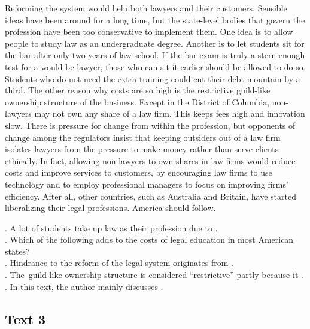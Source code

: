   Reforming the system would help both lawyers and their customers. Sensible ideas have been around for a long time, but the state-level bodies that govern the profession have been too conservative to implement them. One idea is to allow people to study law as an undergraduate degree. Another is to let students sit for the bar after only two years of law school. If the bar exam is truly a stern enough test for a would-be lawyer, those who can sit it earlier should be allowed to do so. Students who do not need the extra training could cut their debt mountain by a third.
The other reason why costs are so high is the restrictive guild-like ownership structure of the business. Except in the District of Columbia, non-lawyers may not own any share of a law firm. This keeps fees high and innovation slow. There is pressure for change from within the profession, but opponents of change among the regulators insist that keeping outsiders out of a law firm isolates lawyers from the pressure to make money rather than serve clients ethically.
In fact, allowing non-lawyers to own shares in law firms would reduce costs and improve services to customers, by encouraging law firms to use technology and to employ professional managers to focus on improving firms’ efficiency. After all, other countries, such as Australia and Britain, have started liberalizing their legal professions. America should follow.
\begin{questions} . A lot of students take up law as their profession due to \ltk{}.
\\ . Which of the following adds to the costs of legal education in most American states?
\\ . Hindrance to the reform of the legal system originates from \ltk{}.
\\ . The guild-like ownership structure is considered “restrictive” partly because it \ltk{}.
\\ . In this text, the author mainly discusses \ltk{}.
\\ \end{questions}      \subsection{Text 3}
